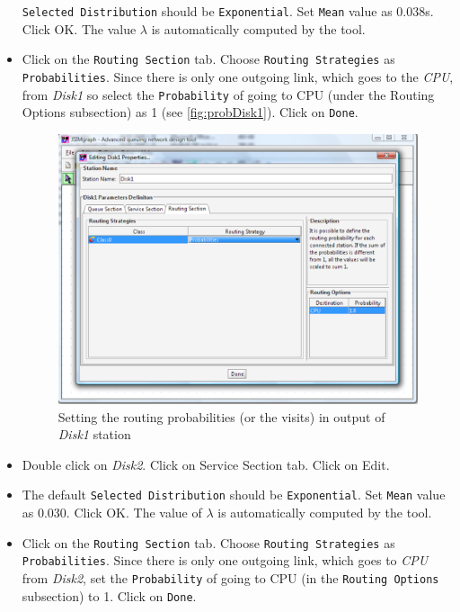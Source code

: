 \begin{itemize}
\texttt{Selected Distribution} should be \texttt{Exponential}. Set
\texttt{Mean} value as 0.038s. Click OK. The value $\lambda$ is
automatically computed by the tool. \item Click on the
\texttt{Routing Section} tab. Choose \texttt{Routing Strategies}
as \texttt{Probabilities}. Since there is only one outgoing link,
which goes to the \emph{CPU}, from \emph{Disk1} so select the
\texttt{Probability} of going to CPU (under the Routing Options
subsection) as 1 (see \autoref{fig:probDisk1}). Click on
\texttt{Done}.
\begin{figure}[htb]
    \begin{center}
        \includegraphics[scale=.5]{img/jsimg/12.8.eps}
    \end{center}
    \caption{Setting the routing probabilities (or the visits) in output
    of \emph{Disk1} station}
    \label{fig:probDisk1}
\end{figure}
\item Double click on \emph{Disk2}. Click on Service Section tab.
Click on Edit. \item The default \texttt{Selected Distribution}
should be \texttt{Exponential}. Set \texttt{Mean} value as 0.030.
Click OK. The value of $\lambda$ is automatically computed by the
tool. \item Click on the \texttt{Routing Section} tab. Choose
\texttt{Routing Strategies} as \texttt{Probabilities}.  Since
there is only one outgoing link, which goes to \emph{CPU} from
\emph{Disk2}, set the \texttt{Probability} of going to CPU (in the
\texttt{Routing Options} subsection) to 1. Click on \texttt{Done}.
\end{itemize}

